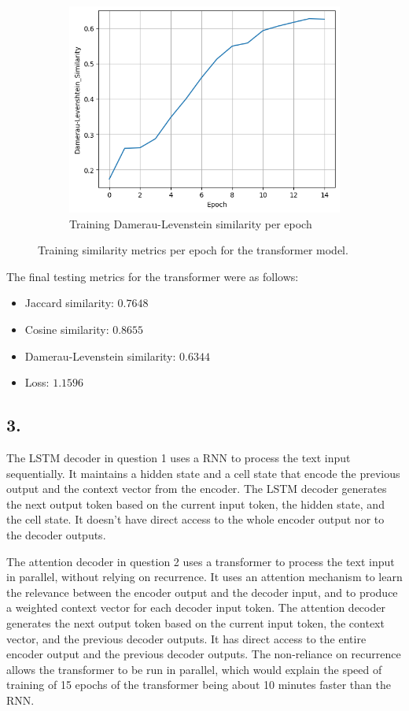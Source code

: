 \documentclass[11pt]{article}
\begin{document}
\begin{figure}[H]
\begin{subfigure}{.5\textwidth}
  \includegraphics[width=.9\linewidth]{plots/transformer_damerau-levenstein_similarity_per_epoch}
  \caption{Training Damerau-Levenstein similarity per epoch}
\end{subfigure}
\caption{Training similarity metrics per epoch for the transformer model.}
\label{fig:transformer_similarity_per_epoch}
\end{figure}

The final testing metrics for the transformer were as follows:
\begin{itemize}
    \item Jaccard similarity: $0.7648$
    \item Cosine similarity: $0.8655$
    \item Damerau-Levenstein similarity: $0.6344$
    \item Loss: $1.1596$
\end{itemize}

\subsection{3.}
The LSTM decoder in question 1 uses a RNN to process the text input sequentially.
It maintains a hidden state and a cell state that encode the previous output and the context vector from the encoder.
The LSTM decoder generates the next output token based on the current input token, the hidden state, and the cell state.
It doesn't have direct access to the whole encoder output nor to the decoder outputs.

The attention decoder in question 2 uses a transformer to process the text input in parallel, without relying on recurrence.
It uses an attention mechanism to learn the relevance between the encoder output and the decoder input, and to produce a weighted context vector for each decoder input token.
The attention decoder generates the next output token based on the current input token, the context vector, and the previous decoder outputs.
It has direct access to the entire encoder output and the previous decoder outputs.
The non-reliance on recurrence allows the transformer to be run in parallel, which would explain the speed of training of 15 epochs of the transformer being about 10 minutes faster than the RNN.
\end{document}
